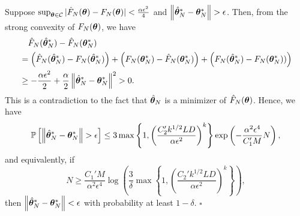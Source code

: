 Suppose $ \sup_{{\bm{\theta}} \in \mathcal{C}}|\hat{F}_N({\bm{\theta}}) - F_N({\bm{\theta}})| <  \frac{\alpha \epsilon^2}{4}$ and $\left \lVert \hat{{\bm{\theta}}}_N^* - {\bm{\theta}}_N^* \right \rVert > \epsilon$. Then, from the strong convexity of $F_N({\bm{\theta}})$, we have
\begin{align*}
    &\quad \hat{F}_N(\hat{{\bm{\theta}}}_N^*) - \hat{F}_N({\bm{\theta}}_N^*)\\
    &= \left( \hat{F}_N(\hat{{\bm{\theta}}}_N^*) - F_N(\hat{{\bm{\theta}}}_N^*) \right) + \left( F_N({\bm{\theta}}_N^*) - \hat{F}_N({\bm{\theta}}_N^*)\right) + \left(  F_N(\hat{{\bm{\theta}}}_N^*) - F_N({\bm{\theta}}_N^*) )\right)\\
    &\geq -\frac{\alpha \epsilon^2 }{2} + \frac{\alpha}{2} \left \lVert \hat{{\bm{\theta}}}_N^* - {\bm{\theta}}_N^* \right \rVert^2 >0.
\end{align*}
This is a contradiction to the fact that $\hat{{\bm{\theta}}}_N$ is a minimizer of $\hat{F}_N({\bm{\theta}})$. Hence, we have
\begin{equation*}
    \mathbb{P} \left[ \left \lVert \hat{{\bm{\theta}}}_N^* - {\bm{\theta}}_N^* \right \rVert >\epsilon \right] \leq 3 \max \left \{1, \left(\frac{C_2'k^{1/2} L D}{\alpha \epsilon^2 }\right)^k \right\} \exp \left( - \frac{\alpha^2 \epsilon^4}{C_1' M}N \right),
\end{equation*}
and equivalently, if 
\begin{equation*}
    N \geq \frac{C_1' M}{ \alpha^2 \epsilon^4} \log\left(\frac{3}{\delta} \max \left\{1, \left(\frac{C_2'k^{1/2} L D}{\alpha \epsilon^2 }\right)^k \right\} \right),
\end{equation*}
then $\left \lVert \hat{{\bm{\theta}}}_N^* - {\bm{\theta}}_N^* \right \rVert <\epsilon$ with probability at least $1-\delta$.
\hfill $\square$
